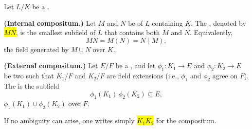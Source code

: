 \begin{definition} \label{definition:compositum_of_fields_in_a_common_extension}
Let $L/K$ be a .

\textbf{(Internal compositum.)} Let $M$ and $N$ be  of $L$ containing $K$. The , denoted by \hl{$MN$}, is the smallest subfield of $L$ that contains both $M$ and $N$. Equivalently,
$$MN = M(N) = N(M),$$
the field generated by $M \cup N$ over $K$.

\textbf{(External compositum.)} Let $E/F$ be a , and let $\phi_1: K_1 \to E$ and $\phi_2: K_2 \to E$ be two  such that $K_1/F$ and $K_2/F$ are field extensions (i.e., $\phi_1$ and $\phi_2$ agree on $F$). The  is the subfield
$$\phi_1(K_1)\,\phi_2(K_2) \subseteq E,$$
 $\phi_1(K_1) \cup \phi_2(K_2)$ over $F$.

If no ambiguity can arise, one writes simply \hl{$K_1 K_2$} for the compositum.
\end{definition}

